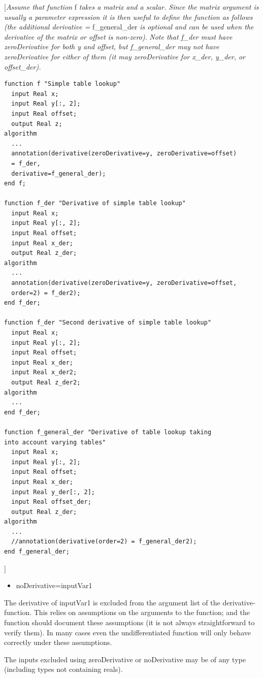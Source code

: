 \documentclass[10pt,a4paper]{report}
\begin{document}
{[}\emph{Assume that function} f \emph{takes a matrix and a scalar.
Since the matrix argument is usually a parameter expression it is then
useful to define the function as follows (the additional derivative =}
f\_general\_der \emph{is optional and can be used when the derivative of
the matrix or offset is non-zero)}. \emph{Note that f\_der must have
zeroDerivative for both y and offset, but f\_general\_der may not have
zeroDerivative for either of them (it may zeroDerivative for x\_der,
y\_der, or offset\_der).}

\begin{lstlisting}[language=modelica]
function f "Simple table lookup"
  input Real x;
  input Real y[:, 2];
  input Real offset;
  output Real z;
algorithm
  ...
  annotation(derivative(zeroDerivative=y, zeroDerivative=offset)
  = f_der,
  derivative=f_general_der);
end f;

function f_der "Derivative of simple table lookup"
  input Real x;
  input Real y[:, 2];
  input Real offset;
  input Real x_der;
  output Real z_der;
algorithm
  ...
  annotation(derivative(zeroDerivative=y, zeroDerivative=offset,
  order=2) = f_der2);
end f_der;

function f_der "Second derivative of simple table lookup"
  input Real x;
  input Real y[:, 2];
  input Real offset;
  input Real x_der;
  input Real x_der2;
  output Real z_der2;
algorithm
  ...
end f_der;

function f_general_der "Derivative of table lookup taking
into account varying tables"
  input Real x;
  input Real y[:, 2];
  input Real offset;
  input Real x_der;
  input Real y_der[:, 2];
  input Real offset_der;
  output Real z_der;
algorithm
  ...
  //annotation(derivative(order=2) = f_general_der2);
end f_general_der;
\end{lstlisting}
{]}

\begin{itemize}
\item
  noDerivative=inputVar1
\end{itemize}

The derivative of inputVar1 is excluded from the argument list of the
derivative-function. This relies on assumptions on the arguments to the
function; and the function should document these assumptions (it is not
always straightforward to verify them). In many cases even the
undifferentiated function will only behave correctly under these
assumptions.

The inputs excluded using zeroDerivative or noDerivative may be of any
type (including types not containing reals).
\end{document}
